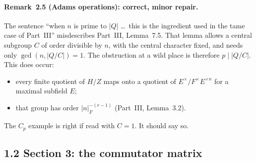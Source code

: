 \documentclass[11pt]{article}
\theoremstyle{definition}
\begin{document}
\paragraph{Remark~2.5 (Adams operations): correct, minor repair.} The
sentence ``when $n$ is prime to $|Q|$ \ldots\ this is the ingredient used
in the tame case of Part~III'' misdescribes Part~III, Lemma~7.5. That
lemma allows a central subgroup $C$ of order divisible by $n$, with the
central character fixed, and needs only $\gcd(n,|Q/C|)=1$. The obstruction
at a wild place is therefore $p\mid|Q/C|$. This does occur:
\begin{itemize}
\item every finite quotient of $H/Z$ maps onto a quotient of
$E^\times/F^\times E^{\times n}$ for a maximal subfield $E$;
\item that group has order $|n|_F^{-(r-1)}$ (Part~III, Lemma~3.2).
\end{itemize}
The $C_p$ example is right if read with $C=1$. It should say so.

\subsection*{1.2 Section 3: the commutator matrix}
\end{document}
